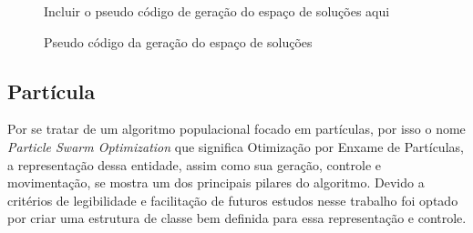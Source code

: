 \begin{figure}[ht]
\centering
\small{Incluir o pseudo código de geração do espaço de soluções aqui}
\caption{Pseudo código da geração do espaço de soluções}
\label{fig:pseudocodigo-solutionspace}
\end{figure}
%

%


    \subsection{Partícula}
            Por se tratar de um algoritmo populacional focado em partículas, por isso o nome \textit{Particle Swarm Optimization} que significa Otimização por Enxame de Partículas, a representação dessa entidade, assim como sua geração, controle e movimentação, se mostra um dos principais pilares do algoritmo. Devido a critérios de legibilidade e facilitação de futuros estudos nesse trabalho foi optado por criar uma estrutura de classe bem definida para essa representação e controle.


